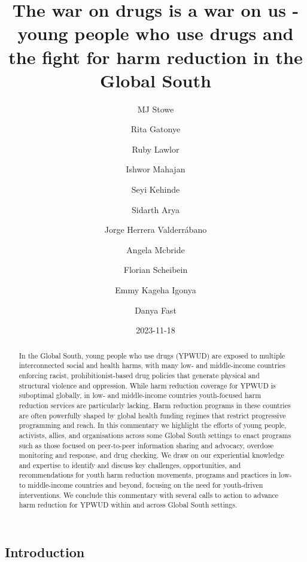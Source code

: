 \documentclass[
  letterpaper,
  DIV=11,
  numbers=noendperiod]{scrartcl}
\title{The war on drugs is a war on us - young people who use drugs and
the fight for harm reduction in the Global South}
\author{MJ Stowe \and Rita Gatonye \and Ruby Lawlor \and Ishwor
Mahajan \and Seyi Kehinde \and Sidarth Arya \and Jorge Herrera
Valderrábano \and Angela Mcbride \and Florian Scheibein \and Emmy Kageha
Igonya \and Danya Fast}
\date{2023-11-18}
\begin{document}
\maketitle
\begin{abstract}
In the Global South, young people who use drugs (YPWUD) are exposed to
multiple interconnected social and health harms, with many low- and
middle-income countries enforcing racist, prohibitionist-based drug
policies that generate physical and structural violence and oppression.
While harm reduction coverage for YPWUD is suboptimal globally, in low-
and middle-income countries youth-focused harm reduction services are
particularly lacking. Harm reduction programs in these countries are
often powerfully shaped by global health funding regimes that restrict
progressive programming and reach. In this commentary we highlight the
efforts of young people, activists, allies, and organisations across
some Global South settings to enact programs such as those focused on
peer-to-peer information sharing and advocacy, overdose monitoring and
response, and drug checking. We draw on our experiential knowledge and
expertise to identify and discuss key challenges, opportunities, and
recommendations for youth harm reduction movements, programs and
practices in low- to middle-income countries and beyond, focusing on the
need for youth-driven interventions. We conclude this commentary with
several calls to action to advance harm reduction for YPWUD within and
across Global South settings.
\end{abstract}
\subsection{Introduction}\label{introduction}
\end{document}
